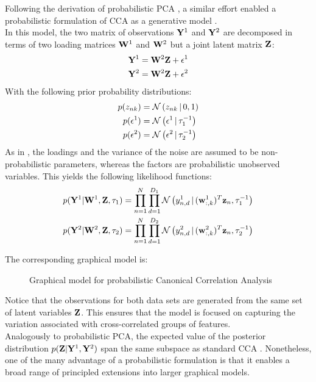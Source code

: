 Following the derivation of probabilistic PCA \cite{Tipping1999}, a similar effort enabled a probabilistic formulation of CCA as a generative model \cite{Bach2005}.\\
In this model, the two matrix of observations ${\bf Y}^{1}$ and ${\bf Y}^{2}$ are decomposed in terms of two loading matrices ${\bf W}^{1}$ and ${\bf W}^{2}$ but a joint latent matrix ${\bf Z}$:
\begin{align*}
	{\bf Y}^{1} &= {\bf W}^{2} {\bf Z} + \epsilon^{1} \\
	{\bf Y}^{2} &= {\bf W}^{2} {\bf Z} + \epsilon^{2}
\end{align*}
With the following prior probability distributions:
\begin{align*}
	p(z_{nk}) &= \mathcal{N}\left(z_{nk} \,|\, 0,1\right) \\
	p(\epsilon^{1}) &= \mathcal{N}\left(\epsilon^{1} \,|\, \tau_{1}^{-1}\right) \\
	p(\epsilon^{2}) &= \mathcal{N}\left(\epsilon^{2} \,|\, \tau_{2}^{-1}\right)
\end{align*}
As in \cite{Tipping1999}, the loadings and the variance of the noise are assumed to be non-probabilistic parameters, whereas the factors are probabilistic unobserved variables. This yields the following likelihood functions:
\begin{align} \label{eq:probabilistic_cca_likelihood}
	p({\bf Y}^{1}|{\bf W}^{1},{\bf Z},\tau_{1}) &= \prod_{n=1}^{N} \prod_{d=1}^{D_1} \mathcal{N}\left(y^{1}_{n,d} \,|\, ({\bf w}_{:,k}^{1})^T {\bf z}_{n},\tau_{1}^{-1}\right) \\
	p({\bf Y}^{2}|{\bf W}^{2},{\bf Z},\tau_{2}) &= \prod_{n=1}^{N} \prod_{d=1}^{D_2} \mathcal{N}\left(y^{2}_{n,d} \,|\, ({\bf w}_{:,k}^{2})^T {\bf z}_{n},\tau_{2}^{-1}\right) \nonumber
\end{align}

The corresponding graphical model is:

\begin{figure}[H] \begin{center}
	
	\label{fig:graphical_CCA}
	\caption{Graphical model for probabilistic Canonical Correlation Analysis}
\end{center} \end{figure}

Notice that the observations for both data sets are generated from the same set of latent variables ${\bf Z}$. This ensures that the model is focused on capturing the variation associated with cross-correlated groups of features.\\
Analogously to probabilistic PCA, the expected value of the posterior distribution $p({\bf Z}|{\bf Y}^{1},{\bf Y}^{2})$ span the same subspace as standard CCA \cite{Bach2005}. Nonetheless, one of the many advantage of a probabilistic formulation is that it enables a broad range of principled extensions into larger graphical models.


